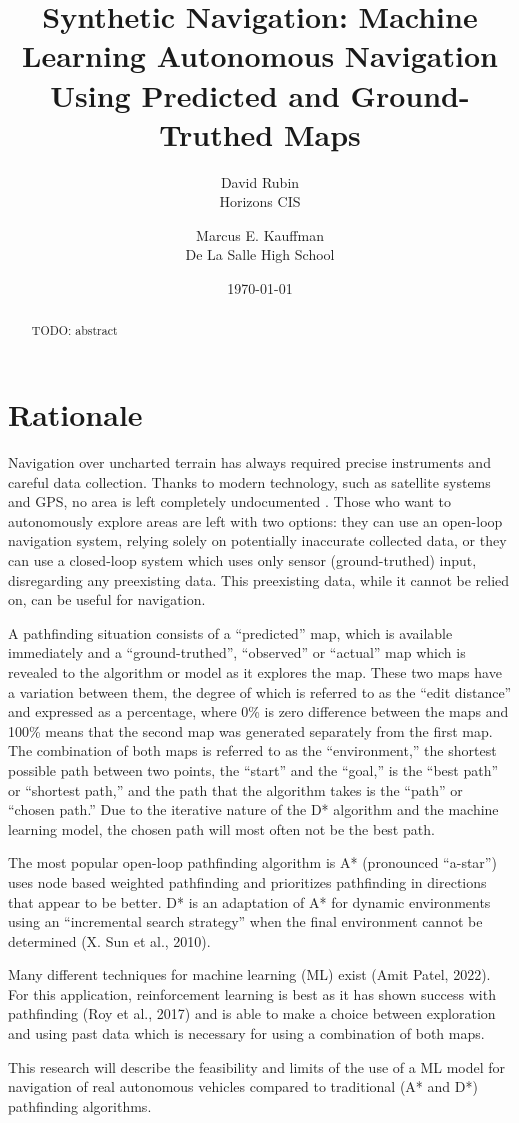 \documentclass{article}
\title{Synthetic Navigation: Machine Learning Autonomous Navigation Using Predicted and Ground-Truthed Maps}
\author{
    David Rubin \\
    Horizons CIS \\
    \and
    Marcus E. Kauffman \\
    De La Salle High School \\
}
\date{\today}
\begin{document}
\maketitle

\begin{abstract}
	TODO: abstract
\end{abstract}

\section{Rationale}
Navigation over uncharted terrain has always required precise instruments
and careful data collection. Thanks to modern technology, such as satellite 
systems and GPS, no area is left completely undocumented \citep{deschamps-berger2020, kervyn2007, li1988}. 
Those who want to autonomously explore areas are left with two options: 
they can use an open-loop navigation system, relying solely on potentially 
inaccurate collected data, or they can use a closed-loop system which uses 
only sensor (ground-truthed) input, disregarding any preexisting data. 
This preexisting data, while it cannot be relied on, can be useful for 
navigation. 

A pathfinding situation consists of a “predicted” map, which is available 
immediately and a “ground-truthed”, “observed” or “actual” map which is 
revealed to the algorithm or model as it explores the map. These two maps 
have a variation between them, the degree of which is referred to as the 
“edit distance” and expressed as a percentage, where 0\% is zero difference 
between the maps and 100\% means that the second map was generated separately 
from the first map. The combination of both maps is referred to as the 
“environment,” the shortest possible path between two points, the “start” 
and the “goal,” is the “best path” or “shortest path,” and the path that 
the algorithm takes is the “path” or “chosen path.” Due to the iterative 
nature of the D* algorithm and the machine learning model, the chosen path 
will most often not be the best path. 

The most popular open-loop pathfinding algorithm is A* (pronounced “a-star”) 
uses node based weighted pathfinding and prioritizes pathfinding in directions 
that appear to be better. D* is an adaptation of A* for dynamic environments 
using an “incremental search strategy” when the final environment cannot be 
determined (X. Sun et al., 2010). 

Many different techniques for machine learning 
(ML) exist (Amit Patel, 2022). For this application, reinforcement learning 
is best as it has shown success with pathfinding (Roy et al., 2017) and is 
able to make a choice between exploration and using past data which is necessary 
for using a combination of both maps. 

This research will describe the 
feasibility and limits of the use of a ML model for navigation of real 
autonomous vehicles compared to traditional (A* and D*) pathfinding algorithms.



\end{document}
